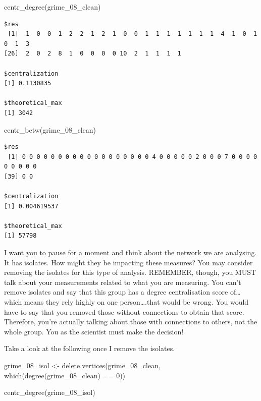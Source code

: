 \documentclass[
  letterpaper,
  DIV=11,
  numbers=noendperiod]{scrreprt}
\newenvironment{Shaded}{\begin{snugshade}}{\end{snugshade}}
\newcommand{\DecValTok}[1]{\textcolor[rgb]{0.68,0.00,0.00}{#1}}
\newcommand{\FunctionTok}[1]{\textcolor[rgb]{0.28,0.35,0.67}{#1}}
\newcommand{\NormalTok}[1]{\textcolor[rgb]{0.00,0.23,0.31}{#1}}
\newcommand{\OtherTok}[1]{\textcolor[rgb]{0.00,0.23,0.31}{#1}}
\newcommand{\SpecialCharTok}[1]{\textcolor[rgb]{0.37,0.37,0.37}{#1}}
\begin{document}
\begin{Shaded}
\begin{Highlighting}[]
\FunctionTok{centr\_degree}\NormalTok{(grime\_08\_clean)}
\end{Highlighting}
\end{Shaded}

\begin{verbatim}
$res
 [1]  1  0  0  1  2  2  1  2  1  0  0  1  1  1  1  1  1  1  4  1  0  1  0  1  3
[26]  2  0  2  8  1  0  0  0  0 10  2  1  1  1  1

$centralization
[1] 0.1130835

$theoretical_max
[1] 3042
\end{verbatim}

\begin{Shaded}
\begin{Highlighting}[]
\FunctionTok{centr\_betw}\NormalTok{(grime\_08\_clean)}
\end{Highlighting}
\end{Shaded}

\begin{verbatim}
$res
 [1] 0 0 0 0 0 0 0 0 0 0 0 0 0 0 0 0 0 0 4 0 0 0 0 0 2 0 0 0 7 0 0 0 0 0 0 0 0 0
[39] 0 0

$centralization
[1] 0.004619537

$theoretical_max
[1] 57798
\end{verbatim}

I want you to pause for a moment and think about the network we are
analysing. It has isolates. How might they be impacting these measures?
You may consider removing the isolates for this type of analysis.
REMEMBER, though, you MUST talk about your measurements related to what
you are measuring. You can't remove isolates and say that this group has
a degree centralisation score of\ldots{} which means they rely highly on
one person\ldots.that would be wrong. You would have to say that you
removed those without connections to obtain that score. Therefore,
you're actually talking about those with connections to others, not the
whole group. You as the scientist must make the decision!

Take a look at the following once I remove the isolates.

\begin{Shaded}
\begin{Highlighting}[]
\NormalTok{grime\_08\_isol }\OtherTok{\textless{}{-}} \FunctionTok{delete.vertices}\NormalTok{(grime\_08\_clean, }\FunctionTok{which}\NormalTok{(}\FunctionTok{degree}\NormalTok{(grime\_08\_clean) }\SpecialCharTok{==} \DecValTok{0}\NormalTok{)) }

\FunctionTok{centr\_degree}\NormalTok{(grime\_08\_isol)}
\end{Highlighting}
\end{Shaded}
\end{document}
